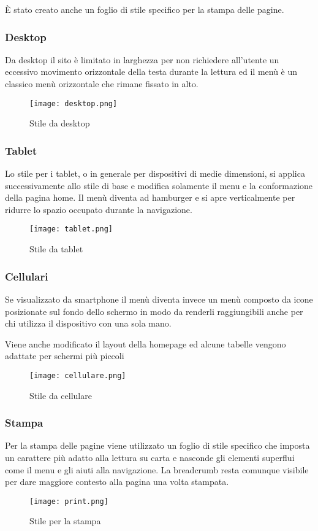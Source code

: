 È stato creato anche un foglio di stile specifico per la stampa delle pagine.

\subsubsection{Desktop}
Da desktop il sito è limitato in larghezza per non richiedere all'utente un eccessivo movimento orizzontale della testa durante la lettura ed il menù è un classico menù orizzontale che rimane fissato in alto.
\begin{figure}[h]
    \centering
    \texttt{[image: desktop.png]}
    \caption{Stile da desktop}
\end{figure}

\subsubsection{Tablet}
Lo stile per i tablet, o in generale per dispositivi di medie dimensioni, si applica successivamente allo stile di base e modifica solamente il menu e la conformazione della pagina home.
Il menù diventa ad hamburger e si apre verticalmente per ridurre lo spazio occupato durante la navigazione.
\begin{figure}[h]
    \centering
    \texttt{[image: tablet.png]}
    \caption{Stile da tablet}
\end{figure}

\subsubsection{Cellulari}
Se visualizzato da smartphone il menù diventa invece un menù composto da icone posizionate sul fondo dello schermo in modo da renderli raggiungibili anche per chi utilizza il dispositivo con una sola mano.

Viene anche modificato il layout della homepage ed alcune tabelle vengono adattate per schermi più piccoli
\begin{figure}[h]
    \centering
    \texttt{[image: cellulare.png]}
    \caption{Stile da cellulare}
\end{figure}

\subsubsection{Stampa}
Per la stampa delle pagine viene utilizzato un foglio di stile specifico che imposta un carattere più adatto alla lettura su carta e nasconde gli elementi superflui come il menu e gli aiuti alla navigazione.
La breadcrumb resta comunque visibile per dare maggiore contesto alla pagina una volta stampata.
\begin{figure}[h]
    \centering
    \texttt{[image: print.png]}
    \caption{Stile per la stampa}
\end{figure}

